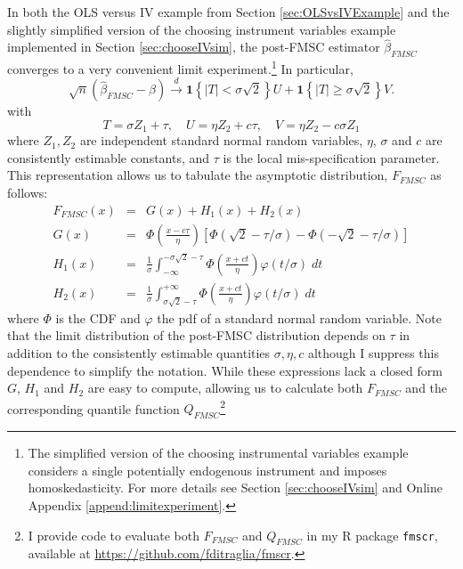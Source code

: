 In both the OLS versus IV example from Section \ref{sec:OLSvsIVExample} and the slightly simplified version of the choosing instrument variables example implemented in Section \ref{sec:chooseIVsim}, the post-FMSC estimator $\widehat{\beta}_{FMSC}$ converges to a very convenient limit experiment.\footnote{The simplified version of the choosing instrumental variables example considers a single potentially endogenous instrument and imposes homoskedasticity.
  For more details see Section \ref{sec:chooseIVsim} and Online Appendix \ref{append:limitexperiment}.}
In particular, 
\begin{equation}
  \sqrt{n}(\widehat{\beta}_{FMSC} - \beta) \overset{d}{\rightarrow}  \mathbf{1}\left\{ |T|<\sigma \sqrt{2} \right\} U +  \mathbf{1}\left\{ |T|\geq\sigma \sqrt{2} \right\} V.
  \label{eq:FMSCLimitExperiment}
\end{equation}
with
\begin{equation}
  T = \sigma Z_1 + \tau, \quad
  U = \eta Z_2 + c\tau, \quad
  V = \eta Z_2 - c\sigma Z_1
\end{equation}
where $Z_1, Z_2$ are independent standard normal random variables, $\eta$, $\sigma$ and $c$ are consistently estimable constants, and $\tau$ is the local mis-specification parameter.
This representation allows us to tabulate the asymptotic distribution, $F_{FMSC}$ as follows: 
\begin{eqnarray}
  F_{FMSC}(x) &=& G(x) + H_1(x) + H_2(x) \\
  \label{eq:FFMSC}
  G(x) &=& \Phi\left( \frac{x - c\tau}{\eta} \right)\left[ \Phi( \sqrt{2} - \tau/\sigma) -  \Phi( -\sqrt{2} - \tau/\sigma )\right]\\
  \label{eq:GFMSC}
  H_1(x) &=& \frac{1}{\sigma}\int_{-\infty}^{-\sigma\sqrt{2} - \tau} \Phi\left( \frac{x + ct}{\eta}\right)\varphi(t/\sigma)\; dt\\
  \label{eq:H1FMSC}
  H_2(x) &=& \frac{1}{\sigma}\int^{+\infty}_{\sigma\sqrt{2} - \tau} \Phi\left( \frac{x + ct}{\eta}\right)\varphi(t/\sigma)\; dt
  \label{eq:H2FMSC}
\end{eqnarray}
where $\Phi$ is the CDF and $\varphi$ the pdf of a standard normal random variable.
Note that the limit distribution of the post-FMSC distribution depends on $\tau$ in addition to the consistently estimable quantities $\sigma, \eta, c$ although I suppress this dependence to simplify the notation.
While these expressions lack a closed form $G$, $H_1$ and $H_2$ are easy to compute, allowing us to calculate both $F_{FMSC}$ and the corresponding quantile function $Q_{FMSC}$\footnote{I provide code to evaluate both $F_{FMSC}$ and $Q_{FMSC}$ in my R package \texttt{fmscr}, available at \url{https://github.com/fditraglia/fmscr}.}

